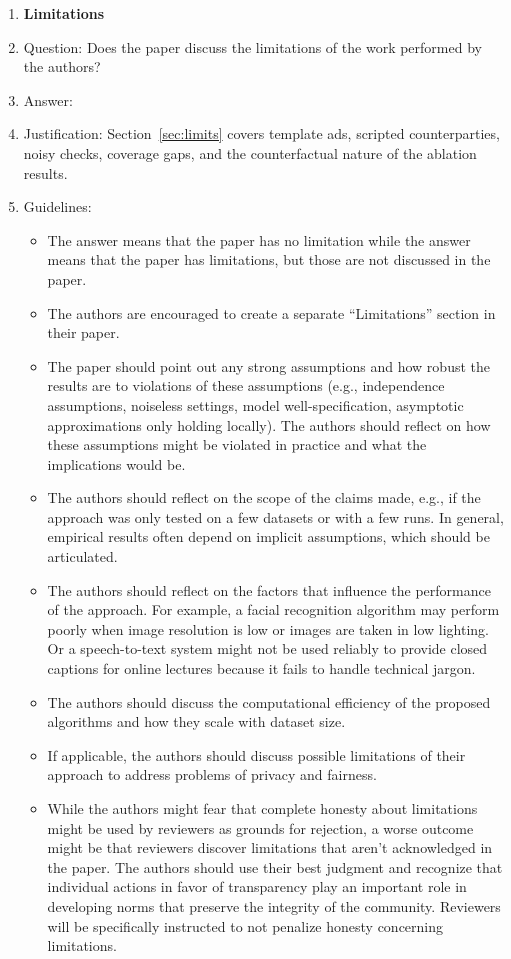\begin{enumerate}
\item {\bf Limitations}
    \item[] Question: Does the paper discuss the limitations of the work performed by the authors?
    \item[] Answer: \answerYes{}
    \item[] Justification: Section~\ref{sec:limits} covers template ads, scripted counterparties, noisy checks, coverage gaps, and the counterfactual nature of the ablation results.
    \item[] Guidelines:
    \begin{itemize}
        \item The answer \answerNA{} means that the paper has no limitation while the answer \answerNo{} means that the paper has limitations, but those are not discussed in the paper.
        \item The authors are encouraged to create a separate ``Limitations'' section in their paper.
        \item The paper should point out any strong assumptions and how robust the results are to violations of these assumptions (e.g., independence assumptions, noiseless settings, model well-specification, asymptotic approximations only holding locally). The authors should reflect on how these assumptions might be violated in practice and what the implications would be.
        \item The authors should reflect on the scope of the claims made, e.g., if the approach was only tested on a few datasets or with a few runs. In general, empirical results often depend on implicit assumptions, which should be articulated.
        \item The authors should reflect on the factors that influence the performance of the approach. For example, a facial recognition algorithm may perform poorly when image resolution is low or images are taken in low lighting. Or a speech-to-text system might not be used reliably to provide closed captions for online lectures because it fails to handle technical jargon.
        \item The authors should discuss the computational efficiency of the proposed algorithms and how they scale with dataset size.
        \item If applicable, the authors should discuss possible limitations of their approach to address problems of privacy and fairness.
        \item While the authors might fear that complete honesty about limitations might be used by reviewers as grounds for rejection, a worse outcome might be that reviewers discover limitations that aren't acknowledged in the paper. The authors should use their best judgment and recognize that individual actions in favor of transparency play an important role in developing norms that preserve the integrity of the community. Reviewers will be specifically instructed to not penalize honesty concerning limitations.
    \end{itemize}


\end{enumerate}
